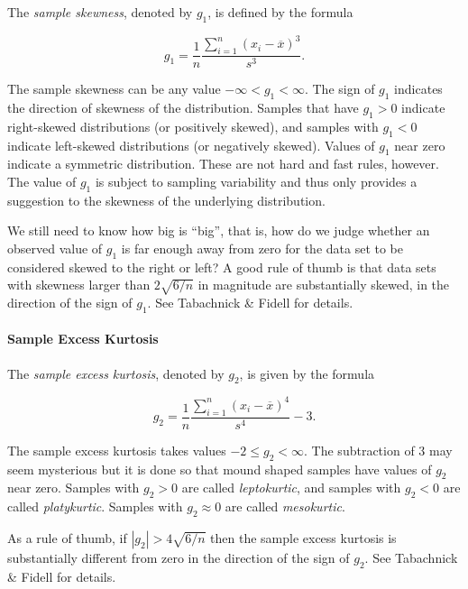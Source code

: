 \documentclass[captions=tableheading]{scrbook}
\begin{document}
The \emph{sample skewness}, denoted by \(g_{1}\), is defined by the formula

\begin{equation}
g_{1}=\frac{1}{n}\frac{\sum_{i=1}^{n}(x_{i}-\overline{x})^{3}}{s^{3}}.
\end{equation}

The sample skewness can be any value \(-\infty<g_{1}<\infty\). The sign of \(g_{1}\) indicates the direction of skewness of the distribution. Samples that have \(g_{1}>0\) indicate right-skewed distributions (or positively skewed), and samples with \(g_{1}<0\) indicate left-skewed distributions (or negatively skewed). Values of \(g_{1}\) near zero indicate a symmetric distribution. These are not hard and fast rules, however. The value of \(g_{1}\) is subject to sampling variability and thus only provides a suggestion to the skewness of the underlying distribution. 

We still need to know how big is ``big'', that is, how do we judge whether an observed value of \(g_{1}\) is far enough away from zero for the data set to be considered skewed to the right or left? A good rule of thumb is that data sets with skewness larger than \(2\sqrt{6/n}\) in magnitude are substantially skewed, in the direction of the sign of \(g_{1}\). See Tabachnick \& Fidell \cite{Tabachnick2006} for details.

\paragraph*{Sample Excess Kurtosis}

The \emph{sample excess kurtosis}, denoted by \(g_{2}\), is given by the formula

\begin{equation}
g_{2}=\frac{1}{n}\frac{\sum_{i=1}^{n}(x_{i}-\overline{x})^{4}}{s^{4}}-3.
\end{equation}

The sample excess kurtosis takes values \(-2\leq g_{2}<\infty\). The subtraction of 3 may seem mysterious but it is done so that mound shaped samples have values of \(g_{2}\) near zero. Samples with \(g_{2}>0\) are called \emph{leptokurtic}, and samples with \(g_{2}<0\) are called \emph{platykurtic}. Samples with \(g_{2}\approx0\) are called \emph{mesokurtic}.

As a rule of thumb, if \(|g_{2}|>4\sqrt{6/n}\) then the sample excess kurtosis is substantially different from zero in the direction of the sign of \(g_{2}\). See Tabachnick \& Fidell \cite{Tabachnick2006} for details.
\end{document}
